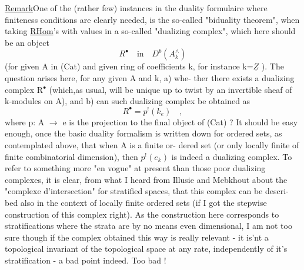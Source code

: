 
\uline{Remark}One of the (rather few) instances in the duality formulaire
where finiteness conditions are clearly needed,  is the so-called
"biduality theorem",  when taking \uline{RHom}'s with values in a so-called
"dualizing complex",  which here should be an object 
\[ R^{\bullet} \quad \text{in} \quad D^{b}(A^{\wedge}_{k}) \]
(for given A in (Cat) and given ring of coefficients\xout{\unsure{,}} k,  for instance
k=$\underline{Z}$  ).  The question arises here,  for any given A and k,  a) whe-%
ther there exists a dualizing complex R$^{\bullet}$  (which,as usual,  will be
unique up to  twist by an invertible sheaf of k-modules on A),  and
b) can such dualizing complex be obtained as
\[ R^{\bullet} = p^{!}(k_{e}) \quad , \]
where  p: A $\longrightarrow$ e is the projection to the final object of (Cat) ?  It
should be easy enough,  once the basic duality formalism is written down
for ordered sets,  as contemplated above,  that when A is a finite or-%
dered set (or only locally finite of finite combinatorial dimension),
then $p^{!}(e_{k})$  is indeed a dualizing complex.  To refer to something
more "en vogue" at present than those poor dualizing complexes,  it is
clear,  from what I heard from Illusie and Mebkhout about the "complexe
d'intersection" for stratified spaces,  that this complex can be descri-%
bed also in the context of locally finite ordered sets (if I got the
stepwise construction of this complex right).  As the construction
here corresponds to stratifications where the strata are by no means
even dimensional,  I am not too sure though if the complex obtained this
way is really relevant  -  it is'nt a topological invariant of the
topological space at any rate,  independently of it's stratification -
a bad point indeed. Too bad !


